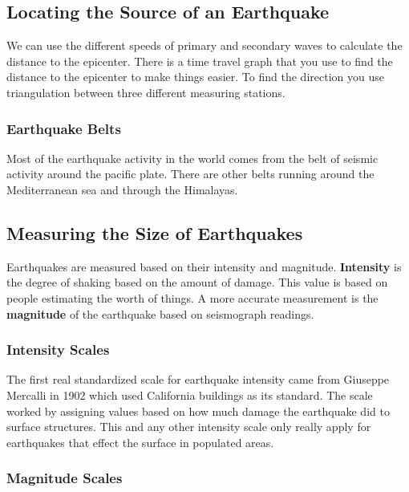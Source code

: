 \documentclass{article}
\begin{document}
\subsection{Locating the Source of an Earthquake} %
\label{sub:locating_the_source_of_an_earthquake}
We can use the different speeds of primary and secondary waves to calculate the distance to the epicenter. There is a time travel graph that you use to find the distance to the epicenter to make things easier. To find the direction you use triangulation between three different measuring stations.

\subsubsection{Earthquake Belts} %
\label{ssub:earthquake_belts}
Most of the earthquake activity in the world comes from the belt of seismic activity around the pacific plate. There are other belts running around the Mediterranean sea and through the Himalayas.
\subsection{Measuring the Size of Earthquakes} %
\label{sub:measuring_the_size_of_earthquakes}
Earthquakes are measured based on their intensity and magnitude. \textbf{Intensity} is the degree of shaking based on the amount of damage. This value is based on people estimating the worth of things. A more accurate measurement is the \textbf{magnitude} of the earthquake based on seismograph readings.

\subsubsection{Intensity Scales} %
\label{ssub:intensity_scales}
The first real standardized scale for earthquake intensity came from Giuseppe Mercalli in 1902 which used California buildings as its standard. The scale worked by assigning values based on how much damage the earthquake did to surface structures. This and any other intensity scale only really apply for earthquakes that effect the surface in populated areas.
\subsubsection{Magnitude Scales} %
\label{ssub:magnitude_scales}
\end{document}
